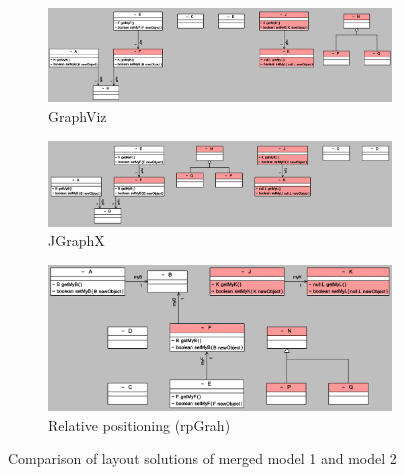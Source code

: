 \begin{figure}
	\centering
    \begin{subfigure}[b]{1\linewidth}
    	\includegraphics[width=\linewidth]{gv_sample.PNG}
        \caption{GraphViz}
        \label{figure : gv sample}
    \end{subfigure}
    \begin{subfigure}[b]{1\linewidth}
    	\includegraphics[width=\linewidth]{gx_sample.PNG}
        \caption{JGraphX}
        \label{figure : gx sample}
    \end{subfigure}
    \begin{subfigure}[b]{1\linewidth}
    	\includegraphics[width=\linewidth]{rp_sample.PNG}
        \caption{Relative positioning (rpGrah)}
        \label{figure : rp sample}
    \end{subfigure}
	\caption{Comparison of layout solutions of merged model 1 and model 2}
    \label{figure : sample solution}
\end{figure}

